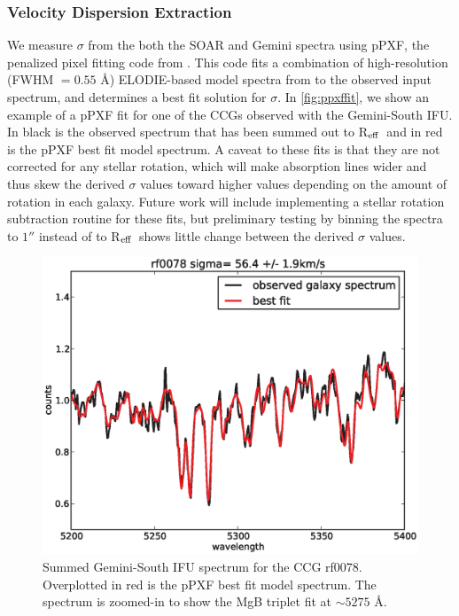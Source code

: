 \documentclass[iop,apj]{emulateapj}
\newcommand{\Reff}{R$_{\rm eff}$}
\begin{document}
\subsubsection{Velocity Dispersion Extraction}

\noindent We measure $\sigma$ from the both the SOAR and Gemini spectra using {\sc pPXF}, the penalized pixel fitting code from \citet{Cappellari2004}. This code fits a combination of high-resolution (FWHM $= 0.55$ \AA) ELODIE-based model spectra from \citet{Maraston2011} to the observed input spectrum, and determines a best fit solution for $\sigma$. In \autoref{fig:ppxffit}, we show an example of a pPXF fit for one of the CCGs observed with the Gemini-South IFU. In black is the observed spectrum that has been summed out to \Reff\ and in red is the pPXF best fit model spectrum. A caveat to these fits is that they are not corrected for any stellar rotation, which will make absorption lines wider and thus skew the derived $\sigma$ values toward higher values depending on the amount of rotation in each galaxy. Future work will include implementing a stellar rotation subtraction routine for these fits, but preliminary testing by binning the spectra to $1''$ instead of to \Reff\ shows little change between the derived $\sigma$ values. 

\begin{figure}[hbpt!]
\begin{center}
\includegraphics[scale=0.4]{rf0078ppxffit.eps}
\caption{Summed Gemini-South IFU spectrum for the CCG rf0078. Overplotted in red is the pPXF best fit model spectrum. The spectrum is zoomed-in to show the MgB triplet fit at $\sim 5275$ \AA.}
\label{fig:ppxffit}
\end{center}
\end{figure}
\end{document}
